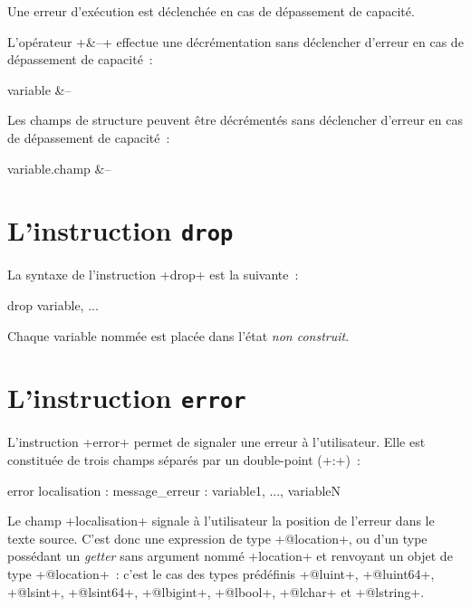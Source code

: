 Une erreur d'exécution est déclenchée en cas de dépassement de capacité.

L'opérateur \ggs+&--+ effectue une décrémentation sans déclencher d'erreur en cas de dépassement de capacité~:
\begin{galgasbox}
variable &--
\end{galgasbox}

Les champs de structure peuvent être décrémentés sans déclencher d'erreur en cas de dépassement de capacité~:
\begin{galgasbox}
variable.champ &--
\end{galgasbox}




\section{L'instruction \texttt{drop}}

La syntaxe de l'instruction \ggs+drop+ est la suivante~:

\begin{galgasbox}
drop variable, ...
\end{galgasbox}

Chaque variable nommée est placée dans l'état \emph{non construit}.








\section{L'instruction \texttt{error}}

L'instruction \ggs+error+ permet de signaler une erreur à l'utilisateur. Elle est constituée de trois champs séparés par un double-point (\ggs+:+)~:

\begin{galgasbox}
error localisation : message_erreur : variable1, ..., variableN
\end{galgasbox}



Le champ \ggs+localisation+ signale à l'utilisateur la position de l'erreur dans le texte source. C'est donc une expression de type \ggs+@location+, ou d'un type possédant un \emph{getter} sans argument nommé \ggs+location+ et renvoyant un objet de type \ggs+@location+~: c'est le cas des types prédéfinis \ggs+@luint+, \ggs+@luint64+, \ggs+@lsint+, \ggs+@lsint64+, \ggs+@lbigint+, \ggs+@lbool+, \ggs+@lchar+ et \ggs+@lstring+.

